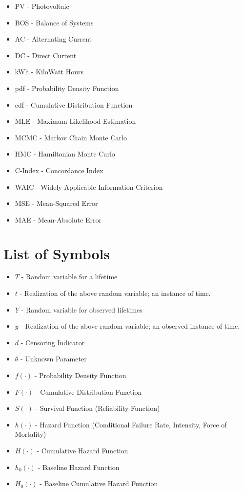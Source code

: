\begin{itemize}

\item[] PV -  Photovoltaic
\item[] BOS - Balance of Systems
\item[] AC - Alternating Current
\item[] DC - Direct Current
\item[] kWh - KiloWatt Hours

\item[] pdf - Probability Density Function
\item[] cdf - Cumulative Distribution Function
\item[] MLE - Maximum Likelihood Estimation
\item[] MCMC - Markov Chain Monte Carlo
\item[] HMC - Hamiltonian Monte Carlo

\item[] C-Index - Concordance Index
\item[] WAIC - Widely Applicable Information Criterion

\item[] MSE - Mean-Squared Error
\item[] MAE - Mean-Absolute Error


\end{itemize}

\section*{List of Symbols}

\begin{itemize}

\item[] $T$ - Random variable for a lifetime
\item[] $t$ - Realization of the above random variable; an instance of time.
\item[] $Y$ - Random variable for observed lifetimes
\item[] $y$ - Realization of the above random variable; an observed instance of time.
\item[] $d$ - Censoring Indicator
\item[] $\theta$ - Unknown Parameter

\item[] $f(\cdot)$ - Probability Density Function
\item[] $F(\cdot)$ - Cumulative Distribution Function
\item[] $S(\cdot)$ - Survival Function (Reliability Function)
\item[] $h(\cdot)$ - Hazard Function (Conditional Failure Rate, Intensity, Force of Mortality)
\item[] $H(\cdot)$ - Cumulative Hazard Function
\item[] $h_0(\cdot)$ - Baseline Hazard Function
\item[] $H_0(\cdot)$ - Baseline Cumulative Hazard Function

\end{itemize}

